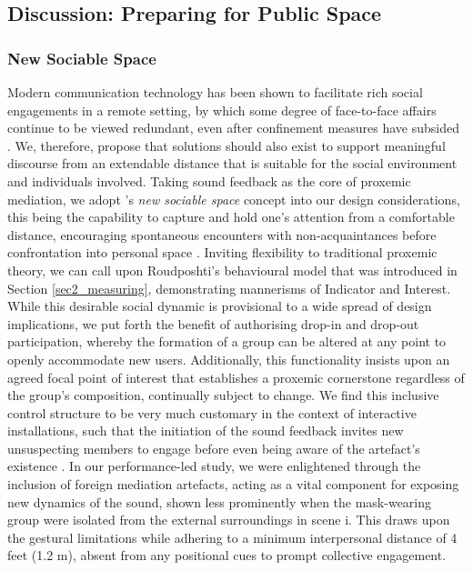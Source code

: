 \subsection{Discussion: Preparing for Public Space}
\label{sec5:discussion}

\subsubsection{New Sociable Space}
Modern communication technology has been shown to facilitate rich social engagements in a remote setting, by which some degree of face-to-face affairs continue to be viewed redundant, even after confinement measures have subsided \citep{cotofan_work_2021}. We, therefore, propose that solutions should also exist to support meaningful discourse from an extendable distance that is suitable for the social environment and individuals involved. Taking sound feedback as the core of proxemic mediation, we adopt \citeauthor{mehta_new_2020}'s \textit{new sociable space} concept into our design considerations, this being the capability to capture and hold one's attention from a comfortable distance, encouraging spontaneous encounters with non-acquaintances before confrontation into personal space \cite{mehta_new_2020}. Inviting flexibility to traditional proxemic theory, we can call upon Roudposhti's behavioural model that was introduced in Section \ref{sec2_measuring}, demonstrating mannerisms of Indicator and Interest.
While this desirable social dynamic is provisional to a wide spread of design implications, we put forth the benefit of authorising drop-in and drop-out participation, whereby the formation of a group can be altered at any point to openly accommodate new users. Additionally, this functionality insists upon an agreed focal point of interest that establishes a proxemic cornerstone regardless of the group's composition, continually subject to change. We find this inclusive control structure to be very much customary in the context of interactive installations, such that the initiation of the sound feedback invites new unsuspecting members to engage before even being aware of the artefact's existence \citep{goudarzi_engagement_2016,rostami_bio-sensed_2017}. In our performance-led study, we were enlightened through the inclusion of foreign mediation artefacts, acting as a vital component for exposing new dynamics of the sound, shown less prominently when the mask-wearing group were isolated from the external surroundings in scene i. This draws upon the gestural limitations while adhering to a minimum interpersonal distance of 4 feet (1.2 m), absent from any positional cues to prompt collective engagement.

